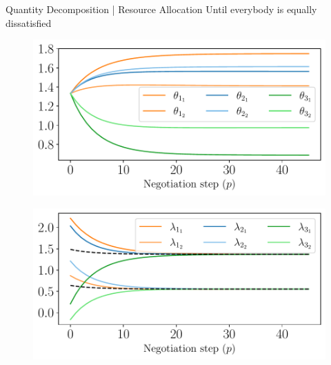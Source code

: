 \documentclass[aspectratio=169]{beamer}
\begin{document}
\begin{frame}{Quantity Decomposition | Resource Allocation}
  \centering
  Until everybody is equally dissatisfied
  \vspace{1cm}

  \begin{minipage}{0.45\textwidth}
    \begin{figure}
      \includegraphics[width=\textwidth]{../img/example_primal_decomposition/example_theta.pdf}
    \end{figure}
  \end{minipage}
  \hfill
  \begin{minipage}{0.45\textwidth}
    \begin{figure}
      \centering
      \includegraphics[width=\textwidth]{../img/example_primal_decomposition/example_lambda.pdf}
    \end{figure}
  \end{minipage}
\end{frame}
\end{document}
